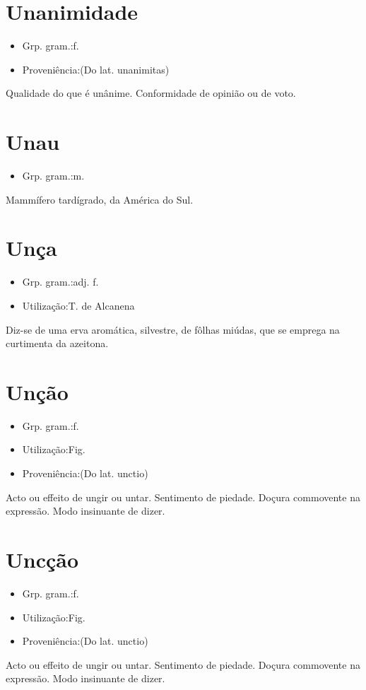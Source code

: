 \documentclass{article}
\begin{document}
\section{Unanimidade}
\begin{itemize}
\item {Grp. gram.:f.}
\end{itemize}
\begin{itemize}
\item {Proveniência:(Do lat. \textunderscore unanimitas\textunderscore )}
\end{itemize}
Qualidade do que é unânime.
Conformidade de opinião ou de voto.
\section{Unau}
\begin{itemize}
\item {Grp. gram.:m.}
\end{itemize}
Mammífero tardígrado, da América do Sul.
\section{Unça}
\begin{itemize}
\item {Grp. gram.:adj. f.}
\end{itemize}
\begin{itemize}
\item {Utilização:T. de Alcanena}
\end{itemize}
Diz-se de uma erva aromática, silvestre, de fôlhas miúdas, que se emprega na curtimenta da azeitona.
\section{Unção}
\begin{itemize}
\item {Grp. gram.:f.}
\end{itemize}
\begin{itemize}
\item {Utilização:Fig.}
\end{itemize}
\begin{itemize}
\item {Proveniência:(Do lat. \textunderscore unctio\textunderscore )}
\end{itemize}
Acto ou effeito de ungir ou untar.
Sentimento de piedade.
Doçura commovente na expressão.
Modo insinuante de dizer.
\section{Uncção}
\begin{itemize}
\item {Grp. gram.:f.}
\end{itemize}
\begin{itemize}
\item {Utilização:Fig.}
\end{itemize}
\begin{itemize}
\item {Proveniência:(Do lat. \textunderscore unctio\textunderscore )}
\end{itemize}
Acto ou effeito de ungir ou untar.
Sentimento de piedade.
Doçura commovente na expressão.
Modo insinuante de dizer.
\end{document}

